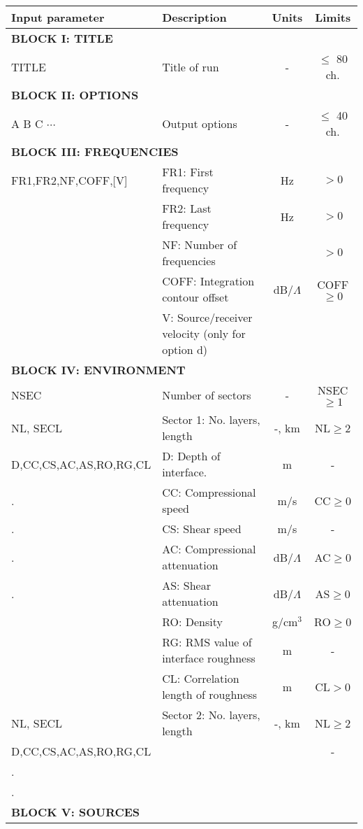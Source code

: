 \begin{table}
\begin{center}
\small
\begin{tabular}{|l|l|c|c|}
\hline \hline
Input parameter & Description & Units & Limits \\
\hline \hline
\multicolumn{4}{|l|}{\bf BLOCK I: TITLE } \\
\hline
TITLE & Title of run  & - & $\leq$ 80 ch. \\
\hline
\multicolumn{4}{|l|}{\bf BLOCK II: OPTIONS} \\
\hline
A B C $\cdots$ & Output options & - & $\leq$ 40 ch. \\
\hline
\multicolumn{4}{|l|}{\bf BLOCK III: FREQUENCIES} \\
\hline
FR1,FR2,NF,COFF,[V] & FR1: First frequency & Hz & $>0$ \\
	& FR2: Last frequency & Hz & $>0$ \\
	& NF: Number of frequencies & & $>0$ \\
 	& COFF: Integration contour offset & dB/$\Lambda$ & COFF$\geq 0$ \\
	& V: Source/receiver velocity (only for option d) \\
\hline
\multicolumn{4}{|l|}{\bf BLOCK IV: ENVIRONMENT} \\
\hline
NSEC            & Number of sectors & - & NSEC$\geq 1$ \\
\hline
NL, SECL	& Sector 1: No. layers, length & -, km & NL$\geq 2$  \\
D,CC,CS,AC,AS,RO,RG,CL & D: Depth of interface. & m & - \\
.	& CC: Compressional speed & m/s & CC$\geq 0$ \\
.	& CS: Shear speed & m/s & - \\
.	& AC: Compressional attenuation & dB/$\Lambda$ & AC$\geq 0$ \\
.	& AS: Shear attenuation & dB/$\Lambda$ & AS$\geq 0$ \\
	& RO: Density 	& g/cm$^{3}$ & RO$\geq 0$ \\
	& RG: RMS value of interface roughness & m & - \\
	& CL: Correlation length of roughness & m & CL$>0$ \\
\hline
NL, SECL	& Sector 2: No. layers, length	& -, km & NL$\geq 2$  \\
D,CC,CS,AC,AS,RO,RG,CL &  &  & - \\
.	& & &  \\
.	& & &  \\
\hline
\multicolumn{4}{|l|}{\bf BLOCK V: SOURCES} \\

\end{tabular}
\end{center}
\end{table}
